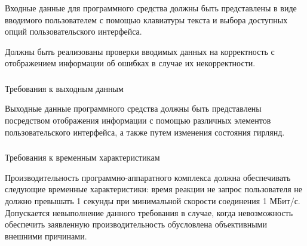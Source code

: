 Входные данные для программного средства должны быть представлены в виде вводимого пользователем с помощью клавиатуры текста и выбора доступных опций пользовательского интерфейса.

Должны быть реализованы проверки вводимых данных на корректность с отображением информации об ошибках в случае их некорректности.

\subsubsection{} Требования к выходным данным
\label{sec:subject:specification:outputs}

Выходные данные программного средства должны быть представлены посредством отображения информации с помощью различных элементов пользовательского интерфейса, а также путем изменения состояния гирлянд.

\subsubsection{} Требования к временным характеристикам
\label{sec:subject:specification:timing}

Производительность программно-аппаратного комплекса должна обеспечивать следующие временные характеристики: время реакции не запрос пользователя не должно превышать 1 секунды при минимальной скорости соединения 1 МБит/с. Допускается невыполнение данного требования в случае, когда невозможность обеспечить заявленную производительность обусловлена объективными внешними причинами.




